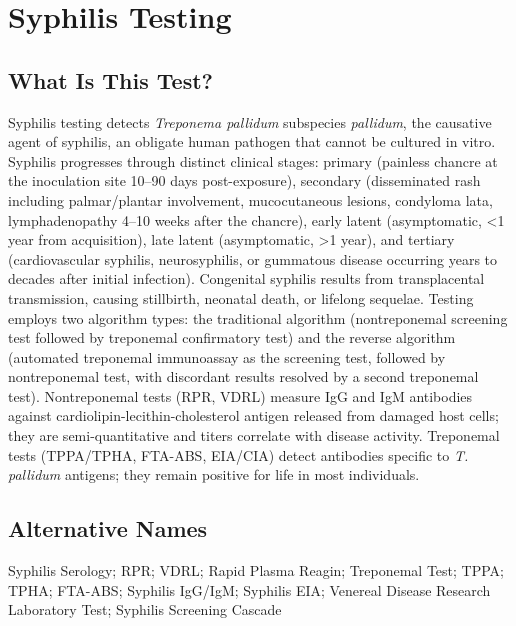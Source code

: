\chapter{Syphilis Testing}

\section*{What Is This Test?}
Syphilis testing detects \textit{Treponema pallidum} subspecies \textit{pallidum}, the causative agent of syphilis, an obligate human pathogen that cannot be cultured in vitro. Syphilis progresses through distinct clinical stages: primary (painless chancre at the inoculation site 10--90 days post-exposure), secondary (disseminated rash including palmar/plantar involvement, mucocutaneous lesions, condyloma lata, lymphadenopathy 4--10 weeks after the chancre), early latent (asymptomatic, <1 year from acquisition), late latent (asymptomatic, >1 year), and tertiary (cardiovascular syphilis, neurosyphilis, or gummatous disease occurring years to decades after initial infection). Congenital syphilis results from transplacental transmission, causing stillbirth, neonatal death, or lifelong sequelae. Testing employs two algorithm types: the traditional algorithm (nontreponemal screening test followed by treponemal confirmatory test) and the reverse algorithm (automated treponemal immunoassay as the screening test, followed by nontreponemal test, with discordant results resolved by a second treponemal test). Nontreponemal tests (RPR, VDRL) measure IgG and IgM antibodies against cardiolipin-lecithin-cholesterol antigen released from damaged host cells; they are semi-quantitative and titers correlate with disease activity. Treponemal tests (TPPA/TPHA, FTA-ABS, EIA/CIA) detect antibodies specific to \textit{T. pallidum} antigens; they remain positive for life in most individuals.

\section*{Alternative Names}
Syphilis Serology; RPR; VDRL; Rapid Plasma Reagin; Treponemal Test; TPPA; TPHA; FTA-ABS; Syphilis IgG/IgM; Syphilis EIA; Venereal Disease Research Laboratory Test; Syphilis Screening Cascade

